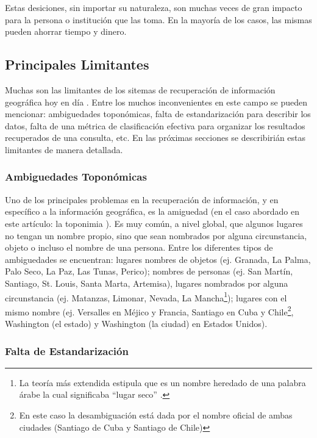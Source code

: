 \documentclass{llncs}
\begin{document}
Estas desiciones, sin importar su naturaleza, son muchas veces de gran impacto
para la persona o institución que las toma. En la mayoría de los casos,
las mismas pueden ahorrar tiempo y dinero.

\subsection{Principales Limitantes}\label{sec:limit}

Muchas son las limitantes de los sitemas de recuperación de información
geográfica hoy en día \cite{purves2011,purves2004}. Entre los muchos
inconvenientes en este campo se pueden mencionar: ambiguedades toponómicas,
falta de estandarización para describir los datos, falta de una métrica de
clasificación efectiva para organizar los resultados recuperados de una
consulta, etc. En las próximas secciones se describirián estas limitantes de
manera detallada.

\subsubsection{Ambiguedades Toponómicas}\label{sec:ambig}

Uno de los principales problemas en la recuperación de información, y en
específico a la información geográfica, es la amiguedad (en el caso abordado en
este artículo: la toponimia \cite{buscaldi2009}). Es muy común, a nivel global,
que algunos lugares no tengan un nombre propio, sino que sean nombrados por
alguna circunstancia, objeto o incluso el nombre de una persona. Entre los
diferentes tipos de ambiguedades se encuentran: lugares nombres de objetos (ej.
Granada, La Palma, Palo Seco, La Paz, Las Tunas, Perico); nombres de personas
(ej. San Martín, Santiago, St. Louis, Santa Marta, Artemisa), lugares nombrados
por alguna circunstancia (ej. Matanzas, Limonar, Nevada, La Mancha\footnote{La
teoría más extendida estipula que es un nombre heredado de una palabra árabe la
cual significaba ``lugar seco'' \cite{laMancha}.}); lugares con el mismo nombre
(ej. Versalles en Méjico y Francia, Santiago en Cuba y Chile\footnote{En este
caso la desambiguación está dada por el nombre oficial de ambas ciudades
(Santiago de Cuba y Santiago de Chile)}, Washington (el estado) y Washington (la
ciudad) en Estados Unidos).

\subsubsection{Falta de Estandarización}\label{sec:estand}
\end{document}
